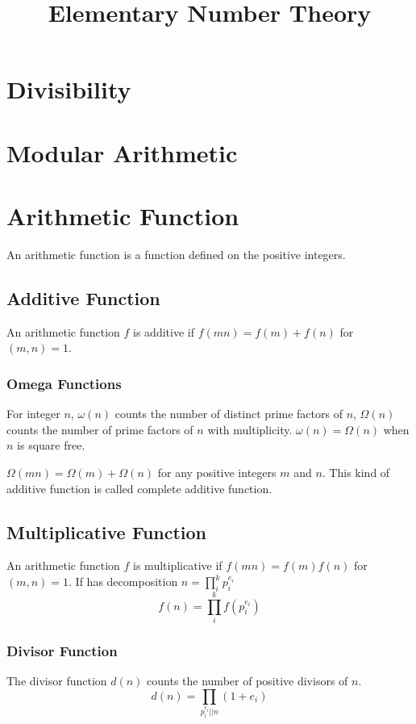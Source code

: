 \documentclass{article}
\title{Elementary Number Theory}
\begin{document}
\maketitle
\newpage
\tableofcontents
\newpage

\section{Divisibility}

\section{Modular Arithmetic}

\section{Arithmetic Function}
An arithmetic function is a function defined on the positive integers.

\subsection{Additive Function}
An arithmetic function $f$ is additive if $f(mn) = f(m) + f(n)$ for $(m, n) = 1$.

\subsubsection*{Omega Functions}
For integer $n$, $\omega(n)$ counts the number of distinct prime factors of $n$,
$\Omega(n)$ counts the number of prime factors of $n$ with multiplicity.
$\omega(n) = \Omega(n)$ when $n$ is square free.

$\Omega(mn) = \Omega(m) + \Omega(n)$ for any positive integers $m$ and $n$.
This kind of additive function is called complete additive function.


\subsection{Multiplicative Function}
An arithmetic function $f$ is multiplicative if $f(mn) = f(m)f(n)$ for $(m, n) = 1$.
If has decomposition $n = \prod_i^k p_i^{e_i}$
$$f(n) = \prod_i^k f(p_i^{e_i})$$

\subsubsection*{Divisor Function}
The divisor function $d(n)$ counts the number of positive divisors of $n$.
$$d(n) = \prod_{p_i^{e_i} \vert\vert n} (1 + e_i)$$
\end{document}

